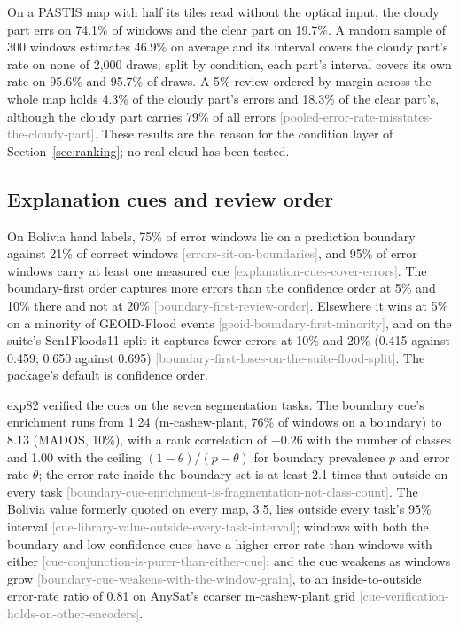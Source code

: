 \documentclass[11pt,a4paper]{article}
\newcommand{\claim}[1]{{\scriptsize\textsf{\textcolor{gray}{[#1]}}}}
\begin{document}
On a PASTIS map with half its tiles read without the optical input, the cloudy part errs on 74.1\% of windows and the
clear part on 19.7\%. A random sample of 300 windows estimates 46.9\% on average and its interval covers the cloudy
part's rate on none of 2,000 draws; split by condition, each part's interval covers its own rate on 95.6\% and 95.7\%
of draws. A 5\% review ordered by margin across the whole map holds 4.3\% of the cloudy part's errors and 18.3\% of
the clear part's, although the cloudy part carries 79\% of all errors \claim{pooled-error-rate-misstates-the-cloudy-part}.
These results are the reason for the condition layer of Section~\ref{sec:ranking}; no real cloud has been tested.

\subsection{Explanation cues and review order}
\label{sec:res-cues}

On Bolivia hand labels, 75\% of error windows lie on a prediction boundary against 21\% of correct windows
\claim{errors-sit-on-boundaries}, and 95\% of error windows carry at least one measured cue
\claim{explanation-cues-cover-errors}. The boundary-first order captures more errors than the confidence order at 5\% and
10\% there and not at 20\% \claim{boundary-first-review-order}. Elsewhere it wins at 5\% on a minority of GEOID-Flood
events \claim{geoid-boundary-first-minority}, and on the suite's Sen1Floods11 split it captures fewer errors at 10\% and
20\% (0.415 against 0.459; 0.650 against 0.695) \claim{boundary-first-loses-on-the-suite-flood-split}. The package's
default is confidence order.

exp82 verified the cues on the seven segmentation tasks. The boundary cue's enrichment runs from 1.24 (m-cashew-plant,
76\% of windows on a boundary) to 8.13 (MADOS, 10\%), with a rank correlation of $-0.26$ with the number of classes and
1.00 with the ceiling $(1-\theta)/(p-\theta)$ for boundary prevalence $p$ and error rate $\theta$; the error rate inside
the boundary set is at least 2.1 times that outside on every task
\claim{boundary-cue-enrichment-is-fragmentation-not-class-count}. The Bolivia value formerly quoted on every map, 3.5,
lies outside every task's 95\% interval \claim{cue-library-value-outside-every-task-interval}; windows with both the
boundary and low-confidence cues have a higher error rate than windows with either \claim{cue-conjunction-is-purer-than-either-cue};
and the cue weakens as windows grow \claim{boundary-cue-weakens-with-the-window-grain}, to an inside-to-outside error-rate
ratio of 0.81 on AnySat's coarser m-cashew-plant grid \claim{cue-verification-holds-on-other-encoders}.
\end{document}

